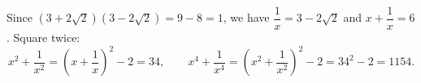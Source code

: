Since $\left(3+2\sqrt2\right)\left(3-2\sqrt2\right)=9-8=1$, we have $\dfrac{1}{x}=3-2\sqrt2$ and $x+\dfrac{1}{x}=6$. Square twice:
\[
x^2+\dfrac{1}{x^2}=\left(x+\dfrac{1}{x}\right)^2-2=34,\qquad x^4+\dfrac{1}{x^4}=\left(x^2+\dfrac{1}{x^2}\right)^2-2=34^2-2=\boxed{1154}.
\]

